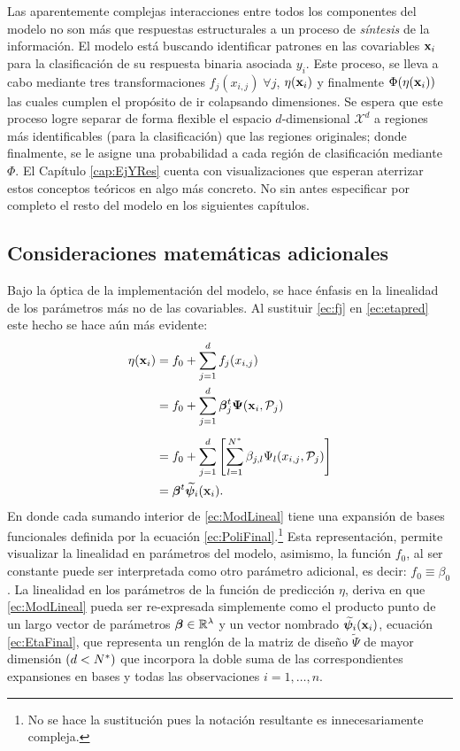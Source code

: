 \documentclass[../Main/Main.tex]{subfiles}
\begin{document}
Las aparentemente complejas interacciones entre todos los componentes del modelo no son más que respuestas estructurales a un proceso de \textit{síntesis} de la información. El modelo está buscando identificar patrones en las covariables $\mathbf{x}_i$ para la clasificación de su respuesta binaria asociada $y_i$. Este proceso, se lleva a cabo mediante tres transformaciones $f_j(x_{i,j}) \; \forall j$, $\eta(\mathbf{x}_i)$ y finalmente $\Phi(\eta(\mathbf{x}_i))$ las cuales cumplen el propósito de ir colapsando dimensiones. Se espera que este proceso logre separar de forma flexible el espacio $d$-dimensional $\mathcal{X}^d$ a regiones más identificables (para la clasificación) que las regiones originales; donde finalmente, se le asigne una probabilidad a cada región de clasificación mediante $\Phi$. El Capítulo \ref{cap:EjYRes} cuenta con visualizaciones que esperan aterrizar estos conceptos teóricos en algo más concreto. No sin antes especificar por completo el resto del modelo en los siguientes capítulos. 

\subsection{Consideraciones matemáticas adicionales}
Bajo la óptica de la implementación del modelo, se hace énfasis en la linealidad de los parámetros más no de las covariables. Al sustituir \eqref{ec:fj} en \eqref{ec:etapred} este hecho se hace aún más evidente:
\begin{align}
	\eta(\mathbf{x}_i) &= f_0 + \sum_{j=1}^d f_j(x_{i,j}) \nonumber\\
			   &= f_0 + \sum_{j=1}^d \bm{\beta}^t_j\bm{\Psi}(\mathbf{x}_i,\mathcal{P}_j) \nonumber\\[4pt]
	&= f_0 + \sum_{j=1}^d  \left[\sum_{l = 1}^{N^*} \beta_{j,l} \Psi_l(x_{i,j}, \mathcal{P}_j)\right]  \label{ec:ModLineal} \\  
	& = \bm{\beta}^t\widetilde{\bm{\psi}}_i(\mathbf{x}_i). \label{ec:EtaFinal}
\end{align}
En donde cada sumando interior de \eqref{ec:ModLineal} tiene una expansión de bases funcionales definida por la ecuación \eqref{ec:PoliFinal}.\footnote{No se hace la sustitución pues la notación resultante es innecesariamente compleja.} Esta representación, permite visualizar la linealidad en parámetros del modelo, asimismo, la función $f_0$, al ser constante puede ser interpretada como otro parámetro adicional, es decir: $f_0 \equiv \beta_0$. La linealidad en los parámetros de la función de predicción $\eta$, deriva en que \eqref{ec:ModLineal} pueda ser re-expresada simplemente como el producto punto de un largo vector de parámetros $\bm{\beta}\in\mathbb{R}^\lambda$ y un vector nombrado $\widetilde{\bm{\psi}}_i(\mathbf{x}_i)$, ecuación \eqref{ec:EtaFinal}, que representa un renglón de la matriz de diseño $\widetilde{\Psi}$ de mayor dimensión $(d<N^*)$ que incorpora la doble suma de las correspondientes expansiones en bases y todas las observaciones $i = 1,\ldots,n$. 
\end{document}
